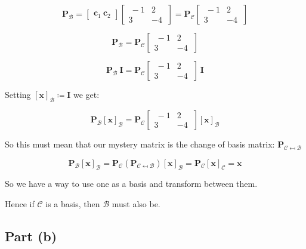 \documentclass{article}
\begin{document}
\[%
    \mathbf{P}_{\mathcal{B}}
    = 
    \begin{bmatrix} \mathbf{c}_{1} \ \mathbf{c}_{2}\end{bmatrix}
    \begin{bmatrix} \ -1 & 2\\ 3 & -4 \ \end{bmatrix}
    = 
    \mathbf{P}_{\mathcal{C}}
    \begin{bmatrix} \ -1 & 2\\ 3 & -4 \ \end{bmatrix}
\]%

\[%
    \mathbf{P}_{\mathcal{B}}
    = 
    \mathbf{P}_{\mathcal{C}}
    \begin{bmatrix} \ -1 & 2\\ 3 & -4 \ \end{bmatrix}
\]%

\[%
    \mathbf{P}_{\mathcal{B}}
    \ \mathbf{I}
    = 
    \mathbf{P}_{\mathcal{C}}
    \begin{bmatrix} \ -1 & 2\\ 3 & -4 \ \end{bmatrix}
    \ \mathbf{I}
\]%

Setting $ [\mathbf{x}]_{\mathcal{B}} \coloneqq \mathbf{I} $ we get:

\[%
    \mathbf{P}_{\mathcal{B}}
    [\mathbf{x}]_{\mathcal{B}}
    = 
    \mathbf{P}_{\mathcal{C}}
    \begin{bmatrix} \ -1 & 2\\ 3 & -4 \ \end{bmatrix}
    [\mathbf{x}]_{\mathcal{B}}
\]%

So this must mean that our mystery matrix is the change of basis matrix: $
\mathbf{P}_{\mathcal{C}\mapsfrom \mathcal{B}} $

\[%
    \mathbf{P}_{\mathcal{B}}
    [\mathbf{x}]_{\mathcal{B}}
    = 
    \mathbf{P}_{\mathcal{C}}
    (\mathbf{P}_{\mathcal{C}\mapsfrom \mathcal{B}}) 
    [\mathbf{x}]_{\mathcal{B}}
    = 
    \mathbf{P}_{\mathcal{C}}
    [\mathbf{x}]_{\mathcal{C}}
    =
    \mathbf{x}
\]%

So we have a way to use one as a basis and transform between them.

Hence if $ \mathcal{C} $ is a basis, then $ \mathcal{B} $ must also be.

\subsection{Part (b)} 
\end{document}
